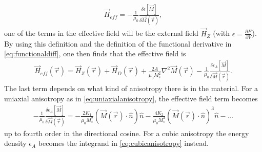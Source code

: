 \documentclass[12pt, a4paper, twoside, openright]{article}		%
\numberwithin{equation}{section}
\begin{document}
\begin{align}
\vec{H}_{eff} = -\frac{1}{\mu_0}\frac{\delta \epsilon[\vec{M}]}{\delta \vec{M}(\vec{r})},
\end{align}
one of the terms in the effective field will be the external field $\vec{H}_Z$ (with $\epsilon = \frac{\partial E}{\partial V}$). By using this definition and the definition of the functional derivative in \eqref{eq:functionaldiff}, one then finds that the effective field is
\begin{align}
\label{eq:effectivefield}
\vec{H}_{eff}(\vec{r}) = \vec{H}_Z(\vec{r}) + \vec{H}_D(\vec{r}) + \frac{2A}{\mu_0M_s^2}\nabla^2\vec{M}(\vec{r}) -\frac{1}{\mu_0}\frac{\delta \epsilon_A[\vec{M}]}{\delta \vec{M}(\vec{r})}.
\end{align}
The last term depends on what kind of anisotropy there is in the material. For a uniaxial anisotropy as in \eqref{eq:uniaxialanisotropy}, the effective field term becomes 
\begin{align}
\label{eq:effielduniaxialani}
-\frac{1}{\mu_0}\frac{\delta \epsilon_A[\vec{M}]}{\delta \vec{M}(\vec{r})} = -\frac{2K_1}{\mu_0 M_s^2}(\vec{M}(\vec{r})\cdot\hat{n})\hat{n} - \frac{4K_2}{\mu_0 M_s^4}(\vec{M}(\vec{r})\cdot\hat{n})^3\hat{n} - \ldots
\end{align}
up to fourth order in the directional cosine. For a cubic anisotropy the energy density $\epsilon_A$ becomes the integrand in \eqref{eq:cubicanisotropy} instead.
\end{document}
